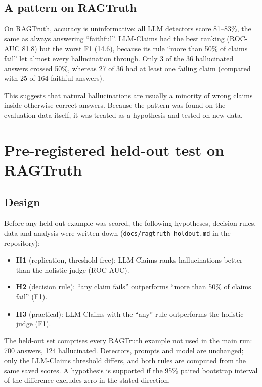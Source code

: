 \documentclass[11pt,a4paper]{article}
\newcommand{\code}[1]{\texttt{\small #1}}
\begin{document}
\subsection{A pattern on RAGTruth}
\label{sec:pattern}

On RAGTruth, accuracy is uninformative: all LLM detectors score 81--83\%, the same as
always answering ``faithful''. LLM-Claims had the best ranking (ROC-AUC 81.8) but the
worst F1 (14.6), because its rule ``more than 50\% of claims fail'' let almost every
hallucination through. Only 3 of the 36 hallucinated answers crossed 50\%, whereas 27
of 36 had at least one failing claim (compared with 25 of 164 faithful answers).

This suggests that natural hallucinations are usually a minority of wrong claims inside
otherwise correct answers. Because the pattern was found on the evaluation data itself,
it was treated as a hypothesis and tested on new data.

\section{Pre-registered held-out test on RAGTruth}
\label{sec:holdout}

\subsection{Design}

Before any held-out example was scored, the following hypotheses, decision rules, data
and analysis were written down (\code{docs/ragtruth\_holdout.md} in the repository):
\begin{itemize}[leftmargin=*]
  \item \textbf{H1} (replication, threshold-free): LLM-Claims ranks hallucinations
        better than the holistic judge (ROC-AUC).
  \item \textbf{H2} (decision rule): ``any claim fails'' outperforms ``more than 50\% of
        claims fail'' (F1).
  \item \textbf{H3} (practical): LLM-Claims with the ``any'' rule outperforms the
        holistic judge (F1).
\end{itemize}
The held-out set comprises every RAGTruth example not used in the main run: 700
answers, 124 hallucinated. Detectors, prompts and model are unchanged; only the
LLM-Claims threshold differs, and both rules are computed from the same saved scores. A
hypothesis is supported if the 95\% paired bootstrap interval of the difference
excludes zero in the stated direction.
\end{document}
